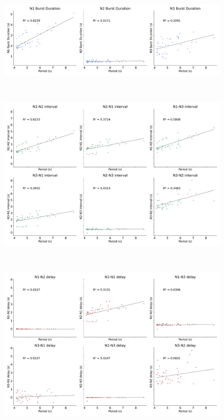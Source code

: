 \begin{figure}[htbp]
\begin{minipage}{0.9\textwidth}
\begin{minipage}[b]{0.53\textwidth}
			\centering
			\begin{minipage}[b]{\textwidth}
				\centering
				\includegraphics[width=\textwidth]{./invariants/data/SUSSEX/CV1a_driven4/images/stim_cv1a4_3phases_durations.pdf}
			\end{minipage}\\
			\begin{minipage}[b]{\textwidth}
				\centering
				\includegraphics[width=\textwidth]{./invariants/data/SUSSEX/CV1a_driven4/images/stim_cv1a4_3phases_intervals.pdf}
			\end{minipage}\\
			\begin{minipage}[b]{\textwidth}
				\centering
				\includegraphics[width=\textwidth]{./invariants/data/SUSSEX/CV1a_driven4/images/stim_cv1a4_3phases_delays.pdf}

\end{minipage}
\end{minipage}
\end{minipage}
\end{figure}
